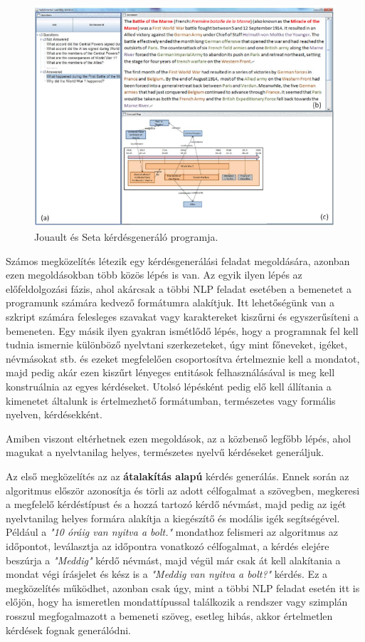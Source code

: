 \begin{figure}[h]
\centering
\includegraphics[scale=0.45]{images/wiki_qg.png}
\caption{Jouault és Seta kérdésgeneráló programja.}
\label{fig:wiki_qg}
\end{figure}


Számos megközelítés létezik egy kérdésgenerálási feladat megoldására, azonban ezen megoldásokban több közös lépés is van. Az egyik ilyen lépés az előfeldolgozási fázis, ahol akárcsak a többi NLP feladat esetében a bemenetet a programunk számára kedvező formátumra alakítjuk. Itt lehetőségünk van a szkript számára felesleges szavakat vagy karaktereket kiszűrni és egyszerűsíteni a bemeneten. Egy másik ilyen gyakran ismétlődő lépés, hogy a programnak fel kell tudnia ismernie különböző nyelvtani szerkezeteket, úgy mint főneveket, igéket, névmásokat stb. és ezeket megfelelően csoportosítva értelmeznie kell a mondatot, majd pedig akár ezen kiszűrt lényeges entitások felhasználásával is meg kell konstruálnia az egyes kérdéseket. Utolsó lépésként pedig elő kell állítania a kimenetet általunk is értelmezhető formátumban, természetes vagy formális nyelven, kérdésekként.

Amiben viszont eltérhetnek ezen megoldások, az a közbenső legfőbb lépés, ahol magukat a nyelvtanilag helyes, természetes nyelvű kérdéseket generáljuk.

Az első megközelítés az az \textbf{átalakítás alapú} kérdés generálás. Ennek során az algoritmus először azonosítja és törli az adott célfogalmat a szövegben, megkeresi a megfelelő kérdéstípust és a hozzá tartozó kérdő névmást, majd pedig az igét nyelvtanilag helyes formára alakítja a kiegészítő és modális igék segítségével. Például a \textit{"10 óráig van nyitva a bolt."} mondathoz felismeri az algoritmus az időpontot, leválasztja az időpontra vonatkozó célfogalmat, a kérdés elejére beszúrja a \textit{"Meddig"} kérdő névmást, majd végül már csak át kell alakítania a mondat végi írásjelet és kész is a \textit{"Meddig van nyitva a bolt?"} kérdés. Ez a megközelítés működhet, azonban csak úgy, mint a többi NLP feladat esetén itt is előjön, hogy ha ismeretlen mondattípussal találkozik a rendszer vagy szimplán rosszul megfogalmazott a bemeneti szöveg, esetleg hibás, akkor értelmetlen kérdések fognak generálódni.

